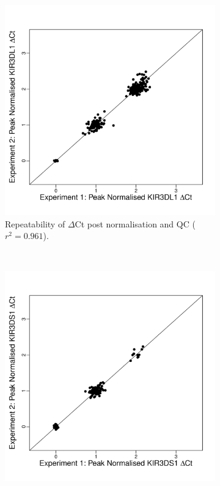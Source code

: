 \begin{figure}[h]
    \centering
    \begin{subfigure}[b]{.4\textwidth}
        \includegraphics[scale=.4] {KIR/figures/DL1-repeatability.pdf}
        \caption{Repeatability of  $\Delta$Ct post normalisation and QC ($r^{2}=0.961$).}
    \end{subfigure}
    ~
    \begin{subfigure}[b]{.4\textwidth}
        \includegraphics[scale=.4] {KIR/figures/DS1-repeatability.pdf}

\end{subfigure}
\end{figure}
